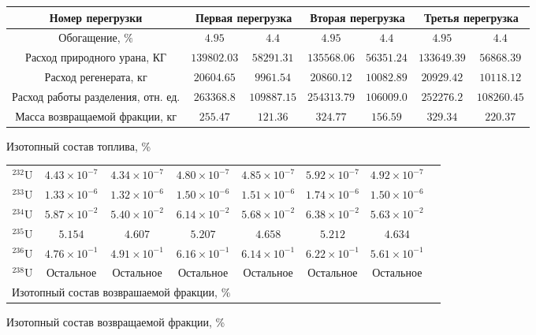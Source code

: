 \begin{table}
\begin{tabular}{|c|c|c|c|c|c|c|}
    \hline \multicolumn{1}{c|}{ Номер перегрузки } & \multicolumn{2}{|c|}{ Первая перегрузка } & \multicolumn{2}{c|}{ Вторая перегрузка } & \multicolumn{2}{|c}{ Третья перегрузка } \\
    \hline Обогащение, $\%$ & $4.95$ & $4.4$ & $4.95$ & $4.4$ & $4.95$ & $4.4$ \\
    Расход природного урана, КГ & $139802.03$ & $58291.31$ & $135568.06$ & $56351.24$ & $133649.39$ & $56868.39$ \\
    Расход регенерата, кг & $20604.65$ & $9961.54$ & $20860.12$ & $10082.89$ & $20929.42$ & $10118.12$ \\
    Расход работы разделения, отн. ед. & $263368.8$ & $109887.15$ & $254313.79$ & $106009.0$ & $252276.2$ & $108260.45$ \\
    Масса возвращаемой фракции, кг & $255.47$ & $121.36$ & $324.77$ & $156.59$ & $329.34$ & $220.37$ \\
    \hline
    \end{tabular}
    Изотопный состав топлива, \%
    \begin{tabular}{c|c|c|c|c|c|c|c}
    \hline${ }^{232} \mathrm{U}$ & $4.43 \times 10^{-7}$ & $4.34 \times 10^{-7}$ & $4.80 \times 10^{-7}$ & $4.85 \times 10^{-7}$ & $5.92 \times 10^{-7}$ & $4.92 \times 10^{-7}$ \\
    ${ }^{233} \mathrm{U}$ & $1.33 \times 10^{-6}$ & $1.32 \times 10^{-6}$ & $1.50 \times 10^{-6}$ & $1.51 \times 10^{-6}$ & $1.74 \times 10^{-6}$ & $1.50 \times 10^{-6}$ \\
    ${ }^{234} \mathrm{U}$ & $5.87 \times 10^{-2}$ & $5.40 \times 10^{-2}$ & $6.14 \times 10^{-2}$ & $5.68 \times 10^{-2}$ & $6.38 \times 10^{-2}$ & $5.63 \times 10^{-2}$ \\
    ${ }^{235} \mathrm{U}$ & $5.154$ & $4.607$ & $5.207$ & $4.658$ & $5.212$ & $4.634$ \\
    ${ }^{236} \mathrm{U}$ & $4.76 \times 10^{-1}$ & $4.91 \times 10^{-1}$ & $6.16 \times 10^{-1}$ & $6.14 \times 10^{-1}$ & $6.22 \times 10^{-1}$ & $5.61 \times 10^{-1}$ \\
    ${ }^{238} \mathrm{U}$ & Остальное & Остальное & Остальное & Остальное & Остальное & Остальное \\
    \hline \multicolumn{4}{|c|}{ Изотопный состав возврашаемой фракции, $\%$}
    \end{tabular}
    Изотопный состав возвращаемой фракции, \%
    \begin{tabular}{|c|c|c|c|c|c|c|}

\end{tabular}
\end{table}
